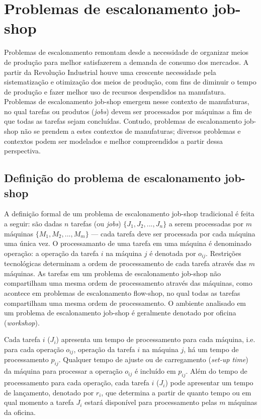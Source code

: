 \documentclass[relatorio,nocolorlinks]{inf-ufg}
\begin{document}
\chapter{Problemas de escalonamento job-shop}
\label{jobshop}

Problemas de escalonamento remontam desde a necessidade de organizar meios de produ\c{c}\~{a}o para melhor satisfazerem a demanda de consumo dos
mercados. A partir da Revolu\c{c}\~{a}o Industrial houve uma crescente necessidade pela sistematiza\c{c}\~{a}o e otimiza\c{c}\~{a}o dos meios de
produ\c{c}\~{a}o, com fins de diminuir o tempo de produ\c{c}\~{a}o e fazer melhor uso de recursos despendidos na manufatura. Problemas de
escalonamento job-shop emergem nesse contexto de manufaturas, no qual tarefas ou produtos (\textit{jobs}) devem ser processados por m\'{a}quinas
a fim de que todas as tarefas sejam conclu\'{i}das. Contudo, problemas de escalonamento job-shop n\~{a}o se prendem a estes contextos de
manufaturas; diversos problemas e contextos podem ser modelados e melhor compreendidos a partir dessa perspectiva.

\section{Defini\c{c}\~{a}o do problema de escalonamento job-shop}

A defini\c{c}\~{a}o formal de um problema de escalonamento job-shop tradicional \cite{French1982} \'{e} feita a seguir: s\~{a}o
dadas $n$ tarefas (ou \textit{jobs}) $ \{ J_{1}, J_{2}, ..., J_{n} \} $ a serem processadas por $m$ m\'{a}quinas $ \{ M_{1}, M_{2}, ..., M_{m} \}
$ --- cada tarefa deve ser processada por cada m\'{a}quina uma \'{u}nica vez. O processamanto de uma tarefa em uma m\'{a}quina \'{e} denominado
opera\c{c}\~{a}o: a opera\c{c}\~{a}o da tarefa $i$ na m\'{a}quina $j$ \'{e} denotada por $o_{ij}$. Restri\c{c}\~{o}es tecnol\'{o}gicas determinam
a ordem de processamento de cada tarefa atrav\'{e}s das $m$ m\'{a}quinas. As tarefas em um problema de escalonamento job-shop n\~{a}o compartilham
uma mesma ordem de processamento atrav\'{e}s das m\'{a}quinas, como acontece em problemas de escalonamento flow-shop, no qual todas as tarefas
compartilham uma mesma ordem de processamento. O ambiente analisado em um problema de escalonamento job-shop \'{e} geralmente denotado por oficina
(\textit{workshop}).

Cada tarefa $i$  ($J_{i}$) apresenta um tempo de processamento para cada m\'{a}quina, i.e. para cada opera\c{c}\~{a}o $o_{ij}$, opera\c{c}\~{a}o
da tarefa $i$ na m\'{a}quina $j$, h\'{a} um tempo de processamento $p_{ij}$. Qualquer tempo de ajuste ou de carregamento (\textit{set-up time})
da m\'{a}quina para processar a opera\c{c}\~{a}o $o_{ij}$ \'{e} inclu\'{i}do em $p_{ij}$. Al\'{e}m do tempo de processamento para cada
opera\c{c}\~{a}o, cada tarefa $i$ ($J_{i}$) pode apresentar um tempo de lan\c{c}amento, denotado por $r_{i}$, que determina a partir de quanto
tempo ou em qual momento a tarefa $J_{i}$ estar\'{a} dispon\'{i}vel para processamento pelas $m$ m\'{a}quinas da oficina.
\end{document}
